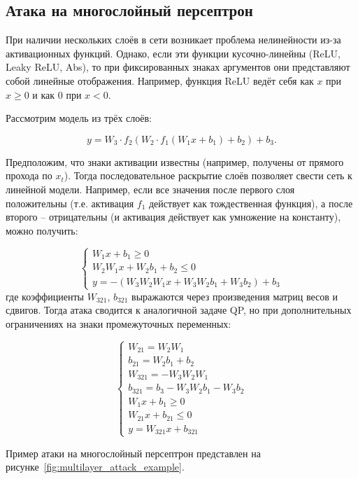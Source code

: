 \subsection{Атака на многослойный персептрон}

При наличии нескольких слоёв в сети возникает проблема нелинейности из-за активационных функций. Однако, если эти функции кусочно-линейны (ReLU, Leaky ReLU, Abs), то при фиксированных знаках аргументов они представляют собой линейные отображения. Например, функция ReLU ведёт себя как \(x\) при \(x \geq 0\) и как \(0\) при \(x < 0\).

Рассмотрим модель из трёх слоёв:

\[
y = W_3 \cdot f_2(W_2 \cdot f_1(W_1 x + b_1) + b_2) + b_3.
\]

Предположим, что знаки активации известны (например, получены от прямого прохода по \(x_t\)). Тогда последовательное раскрытие слоёв позволяет свести сеть к линейной модели. Например, если все значения после первого слоя положительны (т.е. активация \(f_1\) действует как тождественная функция), а после второго -- отрицательны (и активация действует как умножение на константу), можно получить:

\[
\begin{cases}
    W_1x + b_1 \geq 0\\
    W_2W_1x + W_2b_1 + b_2 \leq 0\\
    y = -(W_3W_2W_1x + W_3W_2b_1 + W_3b_2) + b_3 
\end{cases}
\]
где коэффициенты \(W_{321}\), \(b_{321}\) выражаются через произведения матриц весов и сдвигов. Тогда атака сводится к аналогичной задаче QP, но при дополнительных ограничениях на знаки промежуточных переменных:

\[
\begin{cases}
    W_{21} = W_2W_1\\
    b_{21} = W_2b_1 + b_2\\
    W_{321} = -W_3W_2W_1\\
    b_{321} = b_3 - W_3W_2b_1 - W_3b_2\\
    W_1x + b_1 \geq 0\\
    W_{21}x + b_{21} \leq 0\\
    y = W_{321}x + b_{321}
\end{cases}
\]

Пример атаки на многослойный персептрон представлен на рисунке~\cref{fig:multilayer_attack_example}.

